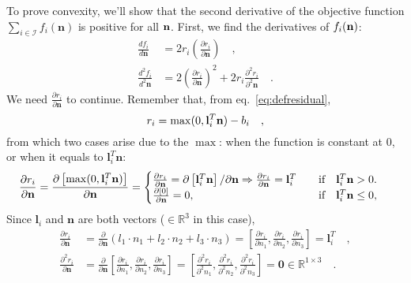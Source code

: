 To prove convexity, we'll show that the second derivative of the objective function $\sum_{i \in \mathcal{I}} f_i(\mathbf{n})$ is positive for all ${\bf n}$. First, we find the derivatives of $f_i({\bf n})$:
\begin{align}
\frac{df_i}{d\mathbf{n}} &= 2r_i \left( \frac{\partial r_i}{\partial \mathbf{n}} \right) \quad, \label{eq:firstder}\\
\frac{d^2f_i}{d^2\mathbf{n}} &= 2\left(\frac{\partial r_i}{\partial \mathbf{n}}\right)^2 + 2r_i \frac{\partial ^2 r_i}{\partial ^2 \mathbf{n}} \quad \label{eq:secder}.
\end{align}
We need $\frac{\partial r_i}{\partial \mathbf{n}}$ to continue. Remember that, from eq.~\eqref{eq:defresidual},
\begin{equation}
r_i = \max( 0, \mathbf{l}_i^T \mathbf{n} ) - b_i\\
\quad,
\end{equation}
from which two cases arise due to the $\max$: when the function is constant at 0, or when it equals to $\mathbf{l}_i^T \mathbf{n}$:
\begin{equation}
\frac{\partial r_i}{\partial \mathbf{n}} = \frac{\partial \left[ \max(0, \mathbf{l}_i^T \mathbf{n}) \right]}{\partial \mathbf{n}}  = 
\begin{cases}
\frac{\partial r_i}{\partial \mathbf{n}} = \partial \left[ \mathbf{l}_i^T \mathbf{n} \right]/\partial \mathbf{n} \Rightarrow  \frac{\partial r_i}{\partial \mathbf{n}} = \mathbf{l}_i^T \qquad \text{if} \quad \mathbf{l}_i^T \mathbf{n} > 0        . \\
\frac{\partial [0]}{\partial \mathbf{n}} = 0, \hfill \text{if} \quad \mathbf{l}_i^T \mathbf{n} \leq 0,
\end{cases}\\
\end{equation}
Since $\mathbf{l}_i$ and $\mathbf{n}$ are both vectors ($\in \mathbb{R}^3$ in this case),
\begin{align}
\frac{\partial r_i}{\partial\mathbf{n}} &= \frac{\partial}{\partial\mathbf{n}} (l_1 \cdot n_1 + l_2 \cdot n_2 + l_3 \cdot n_3) = \left[ \frac{\partial r_i}{\partial n_1}, \frac{\partial r_i}{\partial n_2}, \frac{\partial r_i}{\partial n_3} \right] = \mathbf{l}_i^T \quad, \\
\frac{\partial^2 r_i}{\partial\mathbf{n}} &= \frac{\partial}{\partial\mathbf{n}} \left[ \frac{\partial r_i}{\partial n_1}, \frac{\partial r_i}{\partial n_2}, \frac{\partial r_i}{\partial n_3} \right] = \left[ \frac{\partial ^2 r_i}{\partial ^2 n_1}, \frac{\partial ^2 r_i}{\partial ^2 n_2}, \frac{\partial ^2 r_i}{\partial ^2 n_3} \right] = \mathbf{0} \in \mathbb{R}^{1 \times 3} \quad.
\end{align}
